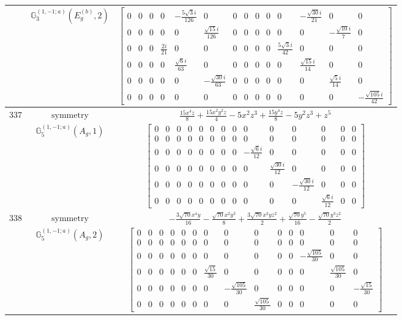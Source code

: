 \documentclass[fleqn,8pt,landscape]{jsarticle}
\begin{document}
\begin{longtable}{ccc}
$  $ & $ \mathbb{G}_{3}^{(1,-1;a)}(E_{g}^{(b)},2) $ & $ \begin{bmatrix} 0 & 0 & 0 & 0 & - \frac{5 \sqrt{3} i}{126} & 0 & 0 & 0 & 0 & 0 & 0 & - \frac{\sqrt{30} i}{21} & 0 & 0 \\ 0 & 0 & 0 & 0 & 0 & \frac{\sqrt{15} i}{126} & 0 & 0 & 0 & 0 & 0 & 0 & - \frac{\sqrt{10} i}{7} & 0 \\ 0 & 0 & 0 & \frac{2 i}{21} & 0 & 0 & 0 & 0 & 0 & 0 & \frac{5 \sqrt{3} i}{42} & 0 & 0 & 0 \\ 0 & 0 & 0 & 0 & \frac{\sqrt{6} i}{63} & 0 & 0 & 0 & 0 & 0 & 0 & \frac{\sqrt{15} i}{14} & 0 & 0 \\ 0 & 0 & 0 & 0 & 0 & - \frac{\sqrt{30} i}{63} & 0 & 0 & 0 & 0 & 0 & 0 & \frac{\sqrt{5} i}{14} & 0 \\ 0 & 0 & 0 & 0 & 0 & 0 & 0 & 0 & 0 & 0 & 0 & 0 & 0 & - \frac{\sqrt{105} i}{42} \end{bmatrix} $ \\ \hline
$ 337 $ & $ \text{symmetry} $ & $ \frac{15 x^{4} z}{8} + \frac{15 x^{2} y^{2} z}{4} - 5 x^{2} z^{3} + \frac{15 y^{4} z}{8} - 5 y^{2} z^{3} + z^{5} $ \\
$  $ & $ \mathbb{G}_{5}^{(1,-1;a)}(A_{g},1) $ & $ \begin{bmatrix} 0 & 0 & 0 & 0 & 0 & 0 & 0 & 0 & 0 & 0 & 0 & 0 & 0 & 0 \\ 0 & 0 & 0 & 0 & 0 & 0 & 0 & 0 & 0 & 0 & 0 & 0 & 0 & 0 \\ 0 & 0 & 0 & 0 & 0 & 0 & 0 & 0 & - \frac{\sqrt{6} i}{12} & 0 & 0 & 0 & 0 & 0 \\ 0 & 0 & 0 & 0 & 0 & 0 & 0 & 0 & 0 & \frac{\sqrt{30} i}{12} & 0 & 0 & 0 & 0 \\ 0 & 0 & 0 & 0 & 0 & 0 & 0 & 0 & 0 & 0 & - \frac{\sqrt{30} i}{12} & 0 & 0 & 0 \\ 0 & 0 & 0 & 0 & 0 & 0 & 0 & 0 & 0 & 0 & 0 & \frac{\sqrt{6} i}{12} & 0 & 0 \end{bmatrix} $ \\ \hline
$ 338 $ & $ \text{symmetry} $ & $ - \frac{3 \sqrt{70} x^{4} y}{16} - \frac{\sqrt{70} x^{2} y^{3}}{8} + \frac{3 \sqrt{70} x^{2} y z^{2}}{2} + \frac{\sqrt{70} y^{5}}{16} - \frac{\sqrt{70} y^{3} z^{2}}{2} $ \\
$  $ & $ \mathbb{G}_{5}^{(1,-1;a)}(A_{g},2) $ & $ \begin{bmatrix} 0 & 0 & 0 & 0 & 0 & 0 & 0 & 0 & 0 & 0 & 0 & 0 & 0 & 0 \\ 0 & 0 & 0 & 0 & 0 & 0 & 0 & 0 & 0 & 0 & 0 & 0 & 0 & 0 \\ 0 & 0 & 0 & 0 & 0 & 0 & 0 & 0 & 0 & 0 & 0 & - \frac{\sqrt{105}}{30} & 0 & 0 \\ 0 & 0 & 0 & 0 & 0 & 0 & \frac{\sqrt{15}}{30} & 0 & 0 & 0 & 0 & 0 & \frac{\sqrt{105}}{30} & 0 \\ 0 & 0 & 0 & 0 & 0 & 0 & 0 & - \frac{\sqrt{105}}{30} & 0 & 0 & 0 & 0 & 0 & - \frac{\sqrt{15}}{30} \\ 0 & 0 & 0 & 0 & 0 & 0 & 0 & 0 & \frac{\sqrt{105}}{30} & 0 & 0 & 0 & 0 & 0 \end{bmatrix} $ \\ \hline

\end{longtable}
\end{document}
